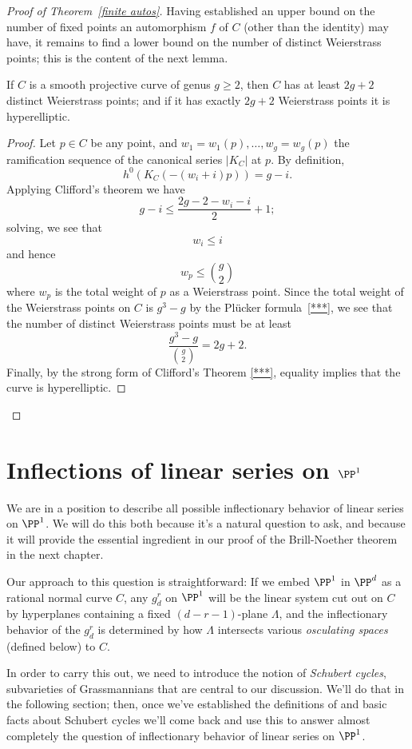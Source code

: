 \begin{proof}[Proof of Theorem~\ref{finite autos}]
Having established an upper  bound on the number of fixed points an automorphism $f$ of $C$ (other than the identity) may have, it remains to find a lower bound on the number of distinct Weierstrass points; this is the content of the next lemma.


\begin{lemma}
If $C$ is a smooth projective curve of genus $g \geq 2$, then $C$ has at least $2g+2$ distinct Weierstrass points; and if it has exactly $2g+2$ Weierstrass points it is hyperelliptic.
\end{lemma}

\begin{proof}
Let $p \in C$ be any point, and $w_1=w_1(p),\dots,w_g = w_g(p)$ the ramification sequence of the canonical series $|K_C|$ at $p$. By definition, 
$$
h^0(K_C(-(w_i+i)p)) = g - i.
$$
Applying Clifford's theorem we have
$$
g-i \leq \frac{2g - 2 - w_i - i}{2} + 1;
$$
solving, we see that
$$
w_i \leq i
$$
and hence
$$
w_p \leq \binom{g}{2}
$$
where $w_p$ is the total weight of $p$ as a Weierstrass point. Since the total weight of the Weierstrass points on $C$ is $g^3-g$ by the Pl\"ucker formula~\ref{***}, we see that the number of distinct Weierstrass points must be at least
$$
\frac{g^3-g}{\binom{g}{2}} = 2g+2.
$$
Finally, by the strong form of Clifford's Theorem \ref{***}, equality implies that the curve is hyperelliptic.\end{proof}


\end{proof}

\section{Inflections of linear series on $\PP^1$}

We are in a position to describe all possible inflectionary behavior of linear series on $\PP^1$. We will do this both because it's a natural question to ask, and because it will provide the essential ingredient in our proof of the Brill-Noether theorem in the next chapter.

Our approach to this question is straightforward: If we embed $\PP^1$ in $\PP^d$ as a rational normal curve $C$, any $g^r_d$ on $\PP^1$ will be the linear system cut out on $C$ by hyperplanes containing a fixed $(d-r-1)$-plane $\Lambda$, and the inflectionary behavior of the $g^r_d$ is determined by how $\Lambda$ intersects various \emph{osculating spaces} (defined below) to $C$.

In order to carry this out, we need to introduce the notion of \emph{Schubert cycles}, subvarieties of Grassmannians that are central to our discussion. We'll do that in the following section; then, once we've established the  definitions of and basic facts about Schubert cycles we'll come back and use this to answer almost completely the question of inflectionary behavior of linear series on $\PP^1$.

